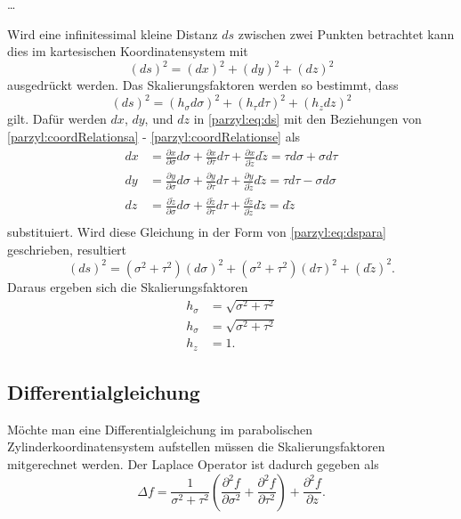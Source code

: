 \dots

Wird eine infinitessimal kleine Distanz $ds$ zwischen zwei Punkten betrachtet
kann dies im kartesischen Koordinatensystem mit
\begin{equation}
    \left(ds\right)^2 = \left(dx\right)^2 + \left(dy\right)^2 + 
    \left(dz\right)^2
    \label{parzyl:eq:ds}
\end{equation}
ausgedrückt werden.
Das Skalierungsfaktoren werden so bestimmt, dass
\begin{equation}
    \left(ds\right)^2 = \left(h_{\sigma}d\sigma\right)^2 + 
    \left(h_{\tau}d\tau\right)^2 + \left(h_z dz\right)^2
\label{parzyl:eq:dspara}
\end{equation}
gilt.
Dafür werden $dx$, $dy$, und $dz$ in \eqref{parzyl:eq:ds} mit den Beziehungen
von \eqref{parzyl:coordRelationsa} - \eqref{parzyl:coordRelationse} als
\begin{align}
    dx  &= \frac{\partial x }{\partial \sigma} d\sigma + 
        \frac{\partial x }{\partial \tau} d\tau + 
        \frac{\partial x }{\partial \tilde{z}} d \tilde{z} 
        = \tau d\sigma + \sigma d \tau \\
    dy &= \frac{\partial y }{\partial \sigma} d\sigma + 
        \frac{\partial y }{\partial \tau} d\tau +
        \frac{\partial y }{\partial \tilde{z}} d \tilde{z} 
        = \tau d\tau - \sigma d \sigma \\
    dz &= \frac{\partial \tilde{z} }{\partial \sigma} d\sigma + 
        \frac{\partial \tilde{z} }{\partial \tau} d\tau +
        \frac{\partial \tilde{z} }{\partial \tilde{z}} d \tilde{z} 
        = d \tilde{z} \\
\end{align}
substituiert.
Wird diese Gleichung in der Form von \eqref{parzyl:eq:dspara}
geschrieben, resultiert
\begin{equation}
    \left(d s\right)^2 = 
        \left(\sigma^2 + \tau^2\right)\left(d\sigma\right)^2 + 
        \left(\sigma^2 + \tau^2\right)\left(d\tau\right)^2 +
        \left(d \tilde{z}\right)^2.
\end{equation}
Daraus ergeben sich die Skalierungsfaktoren 
\begin{align}
    h_{\sigma} &= \sqrt{\sigma^2 + \tau^2}\\
    h_{\sigma} &= \sqrt{\sigma^2 + \tau^2}\\
    h_{z} &= 1.
\end{align}
\subsection{Differentialgleichung}
Möchte man eine Differentialgleichung im parabolischen 
Zylinderkoordinatensystem aufstellen müssen die Skalierungsfaktoren
mitgerechnet werden.
Der Laplace Operator ist dadurch gegeben als
\begin{equation}
    \Delta f = \frac{1}{\sigma^2 + \tau^2} 
        \left( 
            \frac{\partial^2 f}{\partial \sigma ^2} +
            \frac{\partial^2 f}{\partial \tau ^2}
        \right)
        + \frac{\partial^2 f}{\partial z}.
    \label{parzyl:eq:laplaceInParZylCor}
\end{equation}
